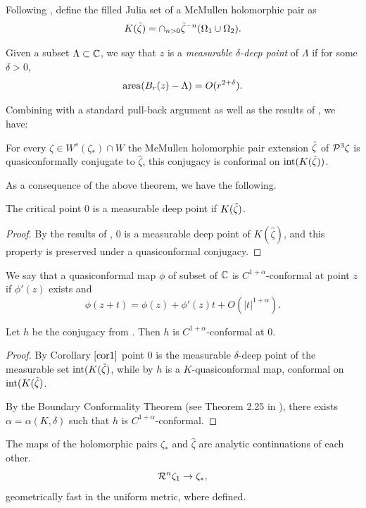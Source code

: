 Following \cite{McM}, define the filled Julia set of a McMullen holomorphic pair as 
$$K(\tilde \zeta)=\cap_{n>0} \tilde \zeta^{-n} (\Omega_1 \cup \Omega_2).$$

Given a subset $\Lambda \subset \mathbb{C}$, we say that $z$ is a {\it measurable $\delta$-deep point} of $\Lambda$ if for some $\delta>0$, 
$${\rm area}(B_r(z)-\Lambda)=O(r^{2+\delta}).$$

Combining  with a standard pull-back argument as well as the results of \cite{McM}, we have:
\begin{thm}
\label{mainthm5}
For every $\zeta \in W^s(\zeta_*) \cap W$  the McMullen holomorphic pair extension  $\tilde \zeta$ of $\mathcal{P}^3 \zeta$ is quasiconformally conjugate to $\hat \zeta$, this conjugacy is conformal on ${\rm int}(K(\tilde \zeta))$.
\end{thm}


As a consequence of the above theorem, we have the following.
\begin{cor}
\label{cor1}
The critical point $0$ is a measurable deep point if $K(\tilde \zeta)$.
\end{cor}
\begin{proof}
By the results of \cite{McM}, $0$ is a measurable deep point of $K(\hat \zeta)$, and this property is preserved under a quasiconformal conjugacy. 
\end{proof}

We say that a quasiconformal map $\phi$ of subset of $\mathbb{C}$ is $C^{1+\alpha}$-conformal at point $z$ if $\phi'(z)$ exists and 
$$\phi(z+t)=\phi(z)+\phi'(z) t+O(|t|^{1+\alpha}).$$

\begin{cor}
Let $h$ be the conjugacy from . Then $h$ is $C^{1+\alpha}$-conformal at $0$.
\end{cor}
\begin{proof}
By Corollary $\ref{cor1}$ point $0$ is the measurable $\delta$-deep point of the measurable set ${\rm int}(K(\tilde \zeta)$, while by  $h$ is a $K$-quasiconformal map, conformal on ${\rm int}(K(\tilde \zeta)$.

By the Boundary Conformality Theorem (see Theorem 2.25 in \cite{McMBook}), there exists $\alpha=\alpha(K,\delta)$ such that $h$ is $C^{1+\alpha}$-conformal.
\end{proof}

\begin{cor}
The maps of the holomorphic pairs $\zeta_*$ and $\hat\zeta$ are analytic continuations of each other.
$$\mathcal{R}^n\zeta_1\to\zeta_*,$$ geometrically fast in the uniform metric, where defined.
\end{cor}
